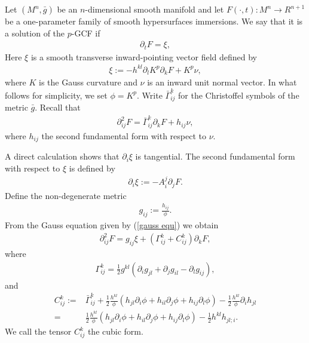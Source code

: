 \documentclass{amsart}
\theoremstyle{definition}
\theoremstyle{remark}
\numberwithin{equation}{section}
\begin{document}
\title[]
 {}

\curraddr{}
\email{}
\date{\today}

\dedicatory{}
\subjclass[2010]{}
\keywords{}

\begin{abstract}

\end{abstract}

\maketitle

Let $(M^n,\bar{g})$ be an $n$-dimensional smooth manifold and let $F(\cdot,t)\colon M^n\to R^{n+1}$ be a one-parameter family of smooth hypersurfaces immersions. We say that it is a solution of the $ p $-GCF if
\begin{align}
\partial_tF=\xi,
\end{align}
Here $\xi $ is a smooth transverse inward-pointing vector field defined by
\begin{align}
\xi:=-h^{kl}\partial_l K ^{ p }\partial_kF+ K ^{ p }\nu,
\end{align}
 where $ K $ is the Gauss curvature and $\nu$ is an inward unit normal vector. In what follows for simplicity, we set $\phi= K ^{ p }.$
Write $\bar{\Gamma}_{ij}^k$ for the Christoffel symbols of the metric $\bar{g}.$ Recall that
\begin{align}\label{gauss equ}
\partial^2_{ij}F=\bar{\Gamma}_{ij}^k\partial_kF+h_{ij}\nu,
\end{align}
where $h_{ij}$ the second fundamental form with respect to $\nu.$

A direct calculation shows that $\partial_i\xi$ is tangential. The second fundamental form with respect to $\xi$ is defined by
\begin{align}
\partial_i\xi:=-A_i^j\partial_jF.
\end{align}
Define the non-degenerate metric
\begin{align}
g_{ij}:=\frac{h_{ij}}{\phi}.
\end{align}
From the Gauss equation given by (\ref{gauss equ}) we obtain
\begin{align}
\partial^2_{ij}F=g_{ij}\xi+(\Gamma_{ij}^k+C_{ij}^k)\partial_kF,
\end{align}
where
\begin{align}
\Gamma_{ij}^k=\frac{1}{2}g^{kl}\left(\partial_ig_{jl}+\partial_jg_{il}-\partial_lg_{ij}\right),
\end{align}
and
\begin{align}
C_{ij}^k:=&\bar{\Gamma}_{ij}^k+\frac{1}{2}\frac{h^{kl}}{\phi}\left(h_{jl}\partial_i\phi+h_{il}\partial_j\phi+h_{ij}\partial_l\phi\right)-\frac{1}{2}\frac{h^{kl}}{\phi}\partial_ih_{jl}\\
=&\frac{1}{2}\frac{h^{kl}}{\phi}\left(h_{jl}\partial_i\phi+h_{il}\partial_j\phi+h_{ij}\partial_l\phi\right)-\frac{1}{2}h^{kl}h_{jl;i}.
\end{align}
 We call the tensor $C_{ij}^k$ the cubic form.
\end{document}
